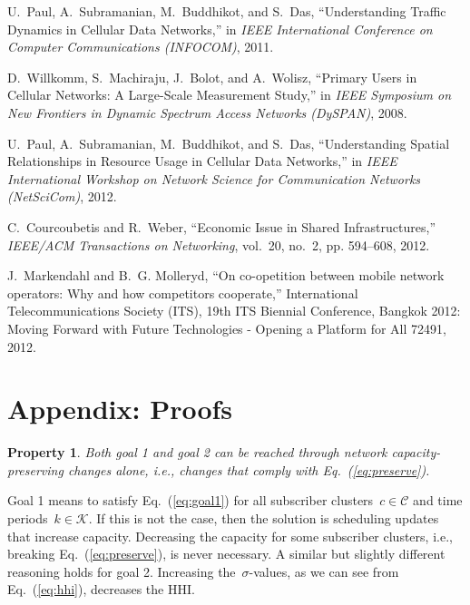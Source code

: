 \documentclass[10pt,journal,cspaper,compsoc]{IEEEtran}
\newcommand{\Eq}[1]{Eq.~(\ref{eq:#1})}
\newtheorem{property}{Property}
\newcommand{\Cc}{\mathcal{C}}
\newcommand{\Kc}{\mathcal{K}}
\begin{document}
\begin{thebibliography}{10}
U.~Paul, A.~Subramanian, M.~Buddhikot, and S.~Das, ``{Understanding Traffic
  Dynamics in Cellular Data Networks},'' in \emph{IEEE International Conference
  on Computer Communications (INFOCOM)}, 2011.

D.~Willkomm, S.~Machiraju, J.~Bolot, and A.~Wolisz, ``{Primary Users in
  Cellular Networks: A Large-Scale Measurement Study},'' in \emph{IEEE
  Symposium on New Frontiers in Dynamic Spectrum Access Networks (DySPAN)},
  2008.

U.~Paul, A.~Subramanian, M.~Buddhikot, and S.~Das, ``{Understanding Spatial
  Relationships in Resource Usage in Cellular Data Networks},'' in \emph{IEEE
  International Workshop on Network Science for Communication Networks
  (NetSciCom)}, 2012.

C.~Courcoubetis and R.~Weber, ``{Economic Issue in Shared Infrastructures},''
  \emph{IEEE/ACM Transactions on Networking}, vol.~20, no.~2, pp. 594--608,
  2012.

J.~Markendahl and B.~G. Molleryd, ``{On co-opetition between mobile network
  operators: Why and how competitors cooperate},'' International
  Telecommunications Society (ITS), 19th ITS Biennial Conference, Bangkok 2012:
  Moving Forward with Future Technologies - Opening a Platform for All 72491,
  2012.

\end{thebibliography}
 
\appendices

\clearpage\newpage

\setcounter{lemma}{0}
\setcounter{property}{0}
\section*{Appendix: Proofs}
\begin{property}
Both goal 1 and goal 2 can be reached through network capacity-preserving changes alone, i.e.,
changes that comply with \Eq{preserve}.
\end{property}
\begin{IEEEproof}
Goal 1 means to satisfy \Eq{goal1} for all subscriber clusters~$c\in\Cc$ and time periods~$k\in\Kc$.
If this is not the case, then the solution is scheduling updates that increase capacity.
Decreasing the capacity for some subscriber clusters, i.e., breaking \Eq{preserve}, is never necessary.
A similar but slightly different reasoning holds for goal 2. Increasing
the~$\sigma$-values, as we can see from \Eq{hhi}, decreases the HHI.
\end{IEEEproof}
\end{document}
